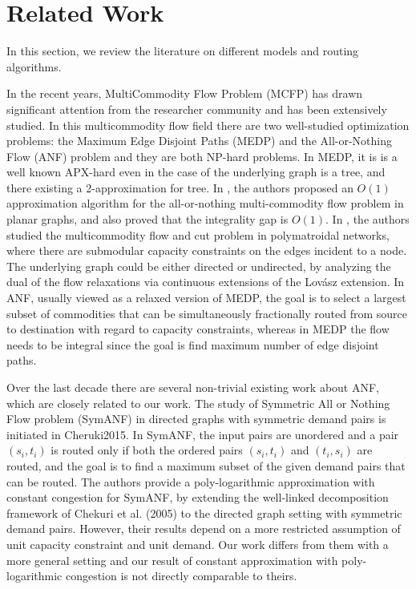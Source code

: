 \documentclass[conference]{IEEEtran}
\begin{document}
\section{Related Work} \label{sec:relatedwork}
In this section, we review the literature on different models and routing algorithms.

In the recent years, MultiCommodity Flow Problem (MCFP) has drawn significant attention from the researcher community and has been extensively studied. In this multicommodity flow field there are two well-studied optimization problems: the Maximum Edge Disjoint Paths (MEDP) and the All-or-Nothing Flow (ANF) problem and they are both NP-hard problems. 
In MEDP, it is is a well known APX-hard even in the case of the underlying graph is a tree, and there existing a 2-approximation for tree. In \cite{Chuzhoy12a}, the authors proposed an $O(1)$ approximation algorithm for the all-or-nothing multi-commodity flow problem in planar graphs, and also proved that the integrality gap is $O(1)$. In \cite{ChekuriKRV15}, the authors studied the multicommodity flow and cut problem in polymatroidal networks, where there are submodular capacity constraints on the edges incident to a node. The underlying graph could be either directed or undirected, by analyzing the dual of the flow relaxations via continuous extensions of the Lovász extension. 
In ANF, usually viewed as a relaxed version of MEDP, the goal is to select a largest subset of commodities that can be simultaneously fractionally routed from source to destination with regard to capacity constraints, whereas in MEDP the flow needs to be integral since the goal is find maximum number of edge disjoint paths.

Over the last decade there are several non-trivial existing work about ANF, which are closely related to our work. The study of Symmetric All or Nothing Flow problem (SymANF) in directed graphs with symmetric demand pairs is initiated in {Cheruki2015}. In SymANF, the input pairs are unordered and a pair $(s_i, t_i)$ is routed only if both the ordered pairs $(s_i, t_i)$ and $(t_i, s_i)$ are routed, and the goal is to find a maximum subset of the given demand pairs that can be routed. The authors provide a poly-logarithmic approximation with constant congestion for SymANF, by extending the well-linked decomposition framework of Chekuri et al. (2005) to the directed graph setting with symmetric demand pairs. However, their results depend on a more restricted assumption of unit capacity constraint and unit demand. Our work differs from them with a more general setting and our result of constant approximation with poly-logarithmic congestion is not directly comparable to theirs.
\end{document}
